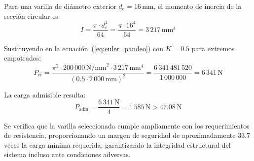 Para una varilla de diámetro exterior $d_e = 16$\,mm, el momento de inercia de la sección circular es:
\[I = \frac{\pi \cdot d_e^4}{64} = \frac{\pi \cdot 16^4}{64} = 3\,217\,\text{mm}^4\]

Sustituyendo en la ecuación~(\ref{eq:euler_pandeo}) con $K = 0.5$ para extremos empotrados:
\[P_{\text{cr}} = \frac{\pi^2 \cdot 200\,000\,\text{N/mm}^2 \cdot 3\,217\,\text{mm}^4}{(0.5 \cdot 2\,000\,\text{mm})^2} = \frac{6\,341\,481\,520}{1\,000\,000} = 6\,341\,\text{N}\]

La carga admisible resulta:
\[P_{\text{adm}} = \frac{6\,341\,\text{N}}{4} = 1\,585\,\text{N} > 47.08\,\text{N}\]

Se verifica que la varilla seleccionada cumple ampliamente con los requerimientos de resistencia, proporcionando un margen de seguridad de aproximadamente 33.7 veces la carga mínima requerida, garantizando la integridad estructural del sistema incluso ante condiciones adversas.

